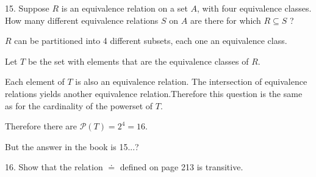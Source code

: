 \documentclass{article}
\begin{document}
\begin{exercise}{}{}
	{15. Suppose $R$ is an equivalence relation on a set $A$, with
		four equivalence classes. How many different equivalence relations $S$ on $A$
		are there for which $R \subseteq S$ ?}
	\begin{alist}
		\item $R$ can be partitioned into 4 different subsets, each one an equivalence
		class.
		\item Let $T$ be the set with elements that are the equivalence classes of $R$.
		\item Each element of $T$ is also an equivalence relation. The
		intersection of equivalence relations yields another equivalence
		relation.Therefore this question is the same as for the cardinality of the
		powerset of $T$.
		\item Therefore there are $\mathscr{P}(T) = 2^4 = 16$.
		\item But the answer in the book is 15...?
	\end{alist}
\end{exercise}{}{}

\begin{exercise}{}{}
	{16. Show that the relation $\doteq$ defined on page 213 is transitive.}
\end{exercise}{}{}
\end{document}
